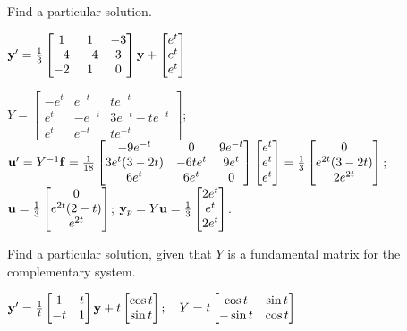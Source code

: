 \documentclass{ximera}
\begin{document}
 \begin{problem}\label{exer:10.7.10}
 Find a particular solution.
 
 $ {\bf
y}'=\frac{1}{3}\begin{bmatrix}1&1&-3\\-4&-4&3\\-2&1&0\end{bmatrix}{\bf
y}+\begin{bmatrix}e^t\\e^t\\e^t\end{bmatrix}$

\begin{solution}
    $Y=\begin{bmatrix}
-e^t&e^{-t}&te^{-t}\\e^t&-e^{-t}&3e^{-t}-te^{-t}\\
e^t&e^{-t}&te^{-t}\end{bmatrix}$;
${\bf u}'=Y^{-1}{\bf f}=
\frac{1}{18}\begin{bmatrix}
-9e^{-t}&0&9e^{-t}\\3e^t(3-2t)&-6te^t&9e^t\\
6e^t&6e^t&0\end{bmatrix}
\begin{bmatrix}e^t\\e^t\\e^t\end{bmatrix}=
\frac{1}{3}\begin{bmatrix}0\\
e^{2t}(3-2t)\\2e^{2t}\end{bmatrix}$;
${\bf u}=
\frac{1}{3}\begin{bmatrix}0\\
e^{2t}(2-t)\\e^{2t}\end{bmatrix}$;
${\bf y}_p=Y{\bf u}=
\frac{1}{3}\begin{bmatrix}
2e^t\\e^t\\2e^t\end{bmatrix}$.
\end{solution}
\end{problem}

 \begin{problem}\label{exer:10.7.11}
 Find a particular solution, given that $Y$ is a fundamental matrix for the complementary system.

$ {\bf y}'=\frac{1}{t}\begin{bmatrix}1&t\\-t&1\end{bmatrix}{\bf y}
+t\begin{bmatrix}
\cos t\\\sin t\end{bmatrix};  \quad Y=t\begin{bmatrix}\cos
t&\sin t\\-\sin t&\cos t
\end{bmatrix}$
\end{problem}
\end{document}
